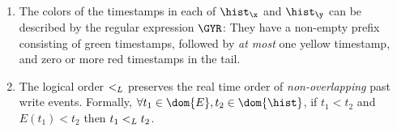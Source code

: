 \begin{enumerate}



\item\label{inv:color} The colors of the timestamps in each of
  $\histx$ and $\histy$ can be described by the regular expression
  $\GYR$: They have a non-empty prefix consisting of green timestamps,
  followed by \emph{at most} one yellow timestamp, and zero or more
  red timestamps in the tail.
%


\item\label{inv:overlap} The logical order $\mathrel{<_L}$ preserves the real
  time order of {\it non-overlapping} past write events. Formally,
  $\forall t_1 \in \dom{E}, t_2 \in \dom{\hist}$, if $t_1 < t_2$ and
  $E(t_1) < t_2$ then $t_1 \mathrel{<_L} t_2$.
  

\end{enumerate}
